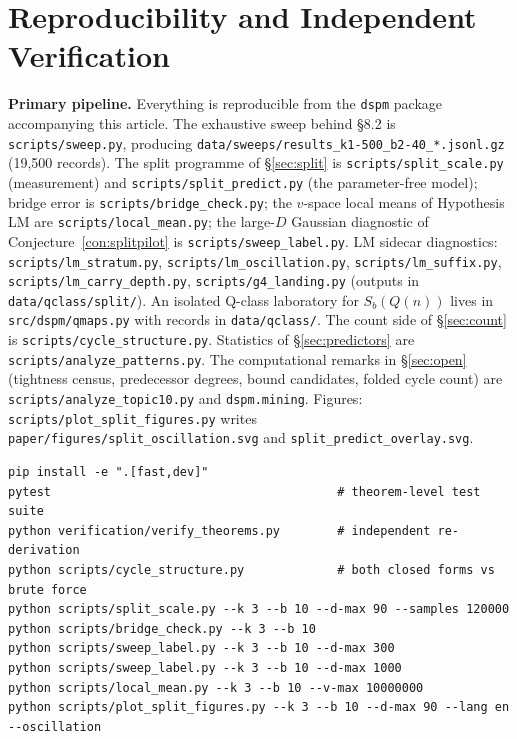\documentclass[11pt]{article}
\theoremstyle{definition}
\theoremstyle{remark}
\begin{document}
\appendix

\section{Reproducibility and Independent Verification}

\textbf{Primary pipeline.} Everything is reproducible from the \texttt{dspm} package accompanying this article. The exhaustive sweep behind \S8.2 is \texttt{scripts/sweep.py}, producing \texttt{data/sweeps/results\_k1-500\_b2-40\_*.jsonl.gz} (19,500 records). The split programme of \S\ref{sec:split} is \texttt{scripts/split\_scale.py} (measurement) and \texttt{scripts/split\_predict.py} (the parameter-free model); bridge error is \texttt{scripts/bridge\_check.py}; the $v$-space local means of Hypothesis LM are \texttt{scripts/local\_mean.py}; the large-$D$ Gaussian diagnostic of Conjecture~\ref{con:splitpilot} is \texttt{scripts/sweep\_label.py}. LM sidecar diagnostics: \texttt{scripts/lm\_stratum.py}, \texttt{scripts/lm\_oscillation.py}, \texttt{scripts/lm\_suffix.py}, \texttt{scripts/lm\_carry\_depth.py}, \texttt{scripts/g4\_landing.py} (outputs in \texttt{data/qclass/split/}). An isolated Q-class laboratory for $S_b(Q(n))$ lives in \texttt{src/dspm/qmaps.py} with records in \texttt{data/qclass/}. The count side of \S\ref{sec:count} is \texttt{scripts/cycle\_structure.py}. Statistics of \S\ref{sec:predictors} are \texttt{scripts/analyze\_patterns.py}. The computational remarks in \S\ref{sec:open} (tightness census, predecessor degrees, bound candidates, folded cycle count) are \texttt{scripts/analyze\_topic10.py} and \texttt{dspm.mining}. Figures: \texttt{scripts/plot\_split\_figures.py} writes \texttt{paper/figures/split\_oscillation.svg} and \texttt{split\_predict\_overlay.svg}.

\begin{verbatim}
pip install -e ".[fast,dev]"
pytest                                        # theorem-level test suite
python verification/verify_theorems.py        # independent re-derivation
python scripts/cycle_structure.py             # both closed forms vs brute force
python scripts/split_scale.py --k 3 --b 10 --d-max 90 --samples 120000
python scripts/bridge_check.py --k 3 --b 10
python scripts/sweep_label.py --k 3 --b 10 --d-max 300
python scripts/sweep_label.py --k 3 --b 10 --d-max 1000
python scripts/local_mean.py --k 3 --b 10 --v-max 10000000
python scripts/plot_split_figures.py --k 3 --b 10 --d-max 90 --lang en --oscillation
\end{verbatim}
\end{document}
